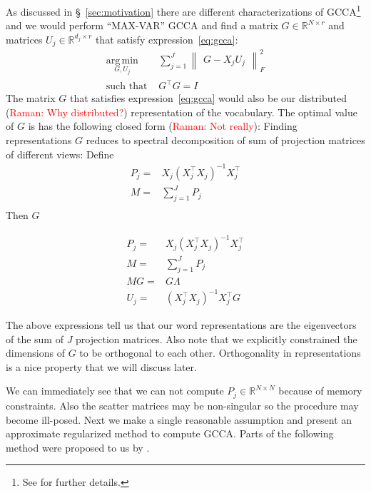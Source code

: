 \documentclass[11pt]{article}
\newcommand{\raman}[1]{ (\textcolor{red}{Raman: #1})}
\begin{document}
As discussed in \S~\ref{sec:motivation} there are different
characterizations of GCCA\footnote{See \cite{kettenring1971canonical}
  for further details.} and we would perform ``MAX-VAR'' GCCA and find
a matrix $G \in \mathbb{R}^{N\times r}$ and matrices $U_j \in
\mathbb{R}^{d_j \times r}$ that satisfy expression~\ref{eq:gcca}:
\begin{equation}
  \label{eq:gcca}
\begin{split}
  \operatorname*{\arg\,\min}_{G,U_j} & \sum_{j=1}^J \begin{Vmatrix} G - X_jU_j \end{Vmatrix}^2_F \\
  \text{such that } & G^\top G = I
\end{split}
\end{equation}
The matrix $G$ that satisfies expression~\ref{eq:gcca} would also be our
distributed\raman{Why distributed?} representation of the vocabulary.
The optimal value of $G$ is has the following closed form\raman{Not really}:
Finding representations $G$ reduces to spectral decomposition of sum of projection matrices of different views: Define
\begin{align}
P_j =& X_j(X_j^\top X_j)^{-1}X_j^\top \label{eq:pp}\\
M =& \sum_{j=1}^J P_j \label{eq:mm}\\
\end{align}
Then $G$ 


\begin{align}
P_j =& X_j(X_j^\top X_j)^{-1}X_j^\top \label{eq:pp}\\
M =& \sum_{j=1}^J P_j \label{eq:mm}\\
M G =& G \Lambda\\
U_j =& \left(X_j^\top X_j\right)^{-1} X_j^\top G
\end{align}

The above expressions tell us that our word representations are the
eigenvectors of the sum of $J$ projection matrices. Also note that we
explicitly constrained the dimensions of $G$ to be orthogonal to each
other. Orthogonality in representations is a nice property that we
will discuss later.

We can immediately see that we can not compute
 $P_j \in \mathbb{R}^{N \times N}$ because of memory constraints.
Also the
scatter matrices may be non-singular so the procedure may become
ill-posed. Next we make a single reasonable assumption and present an
approximate regularized method 
to compute GCCA. Parts of the
following method were proposed to us by \cite{savostyanov}.
\end{document}
